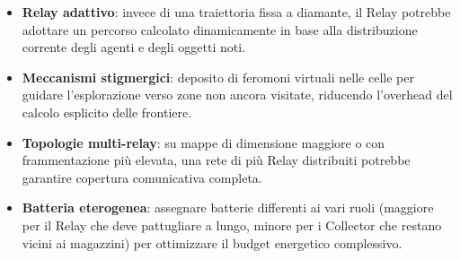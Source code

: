 \begin{itemize}
  \item \textbf{Relay adattivo}: invece di una traiettoria fissa a diamante, il Relay potrebbe adottare un percorso calcolato dinamicamente in base alla distribuzione corrente degli agenti e degli oggetti noti.
  \item \textbf{Meccanismi stigmergici}: deposito di feromoni virtuali nelle celle per guidare l'esplorazione verso zone non ancora visitate, riducendo l'overhead del calcolo esplicito delle frontiere.
  \item \textbf{Topologie multi-relay}: su mappe di dimensione maggiore o con frammentazione più elevata, una rete di più Relay distribuiti potrebbe garantire copertura comunicativa completa.
  \item \textbf{Batteria eterogenea}: assegnare batterie differenti ai vari ruoli (maggiore per il Relay che deve pattugliare a lungo, minore per i Collector che restano vicini ai magazzini) per ottimizzare il budget energetico complessivo.
\end{itemize}
